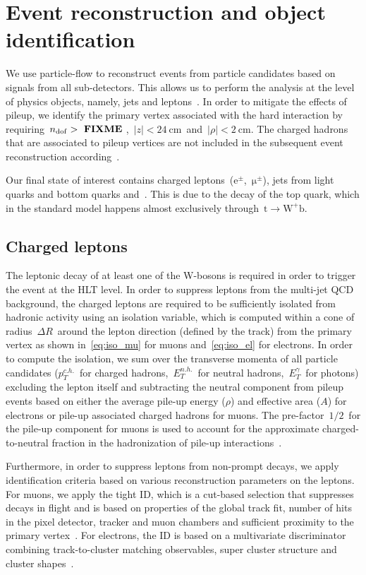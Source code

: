 \section{Event reconstruction and object identification}
\label{sec:object_id}
We use particle-flow to reconstruct events from particle candidates based on signals from all sub-detectors. This allows us to perform the analysis at the level of physics objects, namely, jets and leptons~\cite{cms_particleflow:2017}. In order to mitigate the effects of pileup, we identify the primary vertex associated with the hard interaction by requiring~$n_{\mathrm{dof}} >~\textbf{FIXME}~$,~$|z| < 24~\mathrm{cm}$~and~$|\rho|<2~\mathrm{cm}$. The charged hadrons that are associated to pileup vertices are not included in the subsequent event reconstruction according~\cite{CMS:2014ata}.

Our final state of interest contains charged leptons~($\mathrm{e}^\pm$,~$\mathrm{\mu}^\pm$), jets from light quarks and bottom quarks and~\MET. This is due to the decay of the top quark, which in the standard model happens almost exclusively through~$\mathrm{t} \rightarrow \mathrm{W}^+ \mathrm{b}$.

\subsection{Charged leptons}
\label{sec:object_id_lep}

The leptonic decay of at least one of the W-bosons is required in order to trigger the event at the HLT level. In order to suppress leptons from the multi-jet QCD background, the charged leptons are required to be sufficiently isolated from hadronic activity using an isolation variable, which is computed within a cone of radius~$\Delta R$~around the lepton direction (defined by the track) from the primary vertex as shown in~\cref{eq:iso_mu} for muons and~\cref{eq:iso_el} for electrons. In order to compute the isolation, we sum over the transverse momenta of all particle candidates ($p_T^{c.h.}$~for charged hadrons,~$E_T^{n.h.}$~for neutral hadrons,~$E_T^{\gamma}$~for photons) excluding the lepton itself and subtracting the neutral component from pileup events based on either the average pile-up energy ($\rho$) and effective area ($A$) for electrons or pile-up associated charged hadrons for muons. The pre-factor~$1/2$~for the pile-up component for muons is used to account for the approximate charged-to-neutral fraction in the hadronization of pile-up interactions~\cite{CMS:2012}.

Furthermore, in order to suppress leptons from non-prompt decays, we apply identification criteria based on various reconstruction parameters on the leptons. For muons, we apply the tight ID, which is a cut-based selection that suppresses decays in flight and is based on properties of the global track fit, number of hits in the pixel detector, tracker and muon chambers and sufficient proximity to the primary vertex~\cite{Chatrchyan:2012xi,CMS:2017_muon_pog}. For electrons, the ID is based on a multivariate discriminator combining track-to-cluster matching observables, super cluster structure and cluster shapes~\cite{Khachatryan:2015hwa,CMS:2017_egamma_pog}.

